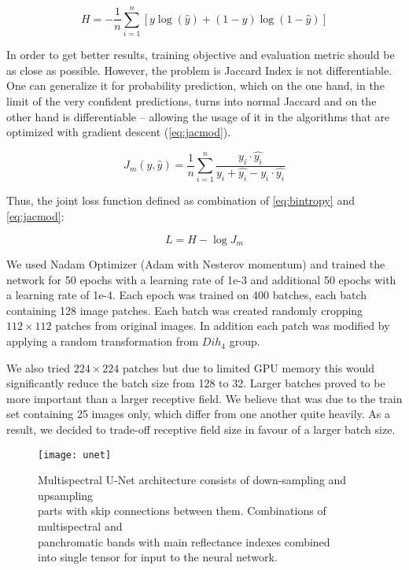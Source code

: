 \documentclass[10pt,twocolumn,letterpaper]{article}
\begin{document}
\begin{equation} \label{eq:bintropy}
H = -\frac{1}{n}\sum_{i=1}^n{[y \log(\widehat{y})+(1-y)\log(1-\widehat{y})]}
\end{equation}

In order to get better results, training objective and evaluation metric should be as close as possible. However, the problem is  Jaccard Index is not differentiable. One can generalize it for probability prediction, which on the one hand, in the limit of the very confident predictions, turns into normal Jaccard and on the other hand is differentiable – allowing the usage of it in the algorithms that are optimized with gradient descent (\ref{eq:jacmod}). 

\begin{equation} \label{eq:jacmod}
J_{m}(y, \widehat{y}) = \frac{1}{n} \sum_{i=1}^n \frac{y_i \cdot \widehat{y_i}}{y_i + \widehat{y_i} - y_i \cdot \widehat{y_i}}
\end{equation}

Thus, the joint loss function defined as combination of \ref{eq:bintropy} and \ref{eq:jacmod}:

\begin{equation}
L = H - \log J_{m}
\end{equation}

We used Nadam Optimizer (Adam with Nesterov momentum) \cite{nadam} and trained the network for 50 epochs with a learning rate of 1e-3 and additional 50 epochs with a learning rate of 1e-4. Each epoch was trained on 400 batches, each batch containing 128 image patches. Each batch was created randomly cropping $112 \times 112$ patches from original images. In addition each patch was modified by applying a random transformation from $Dih_4$ group.

We also tried $224 \times 224$ patches but due to limited GPU memory this would significantly reduce the batch size from 128 to 32. Larger batches proved to be more important than a larger receptive field. We believe that was due to the train set containing 25 images only, which differ from one another quite heavily. As a result, we decided to trade-off receptive field size in favour of a larger batch size.

\begin{figure*}[th]
	\centering
	\texttt{[image: unet]}
	\captionsetup{justification=centering}
	\caption{Multispectral U-Net architecture consists of down-sampling and upsampling \\ parts with skip connections between them.  Combinations of multispectral and \\ panchromatic bands with main reflectance indexes combined \\ into single tensor for input to the neural network. }
	\label{fig:unet}
\end{figure*}
\end{document}
